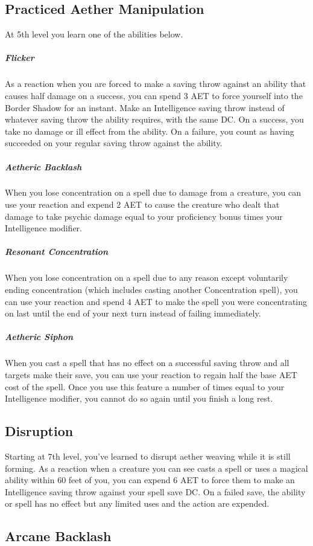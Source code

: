 \subsection{Practiced Aether Manipulation}
At 5th level you learn one of the abilities below.
\subparagraph*{Flicker} As a reaction when you are forced to make a saving throw against an ability that causes half damage on a success, you can spend 3 AET to force yourself into the Border Shadow for an instant. Make an Intelligence saving throw instead of whatever saving throw the ability requires, with the same DC. On a success, you take no damage or ill effect from the ability. On a failure, you count as having succeeded on your regular saving throw against the ability.
\subparagraph*{Aetheric Backlash} When you lose concentration on a spell due to damage from a creature, you can use your reaction and expend 2 AET to cause the creature who dealt that damage to take psychic damage equal to your proficiency bonus times your Intelligence modifier.
\subparagraph*{Resonant Concentration} When you lose concentration on a spell due to any reason except voluntarily ending concentration (which includes casting another Concentration spell), you can use your reaction and spend 4 AET to make the spell you were concentrating on last until the end of your next turn instead of failing immediately.
\subparagraph*{Aetheric Siphon} When you cast a spell that has no effect on a successful saving throw and all targets make their save, you can use your reaction to regain half the base AET cost of the spell. Once you use this feature a number of times equal to your Intelligence modifier, you cannot do so again until you finish a long rest.

\subsection{Disruption}

Starting at 7th level, you've learned to disrupt aether weaving while it is still forming. As a reaction when a creature you can see casts a spell or uses a magical ability within 60 feet of you, you can expend 6 AET to force them to make an Intelligence saving throw against your spell save DC. On a failed save, the ability or spell has no effect but any limited uses and the action are expended.

\subsection{Arcane Backlash}

